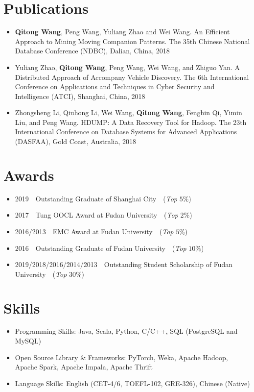 \documentclass{resume}
\begin{document}
\section{Publications}
\begin{itemize}  
  \item \textbf{Qitong Wang}, Peng Wang, Yuliang Zhao and Wei Wang. 
  An Efficient Approach to Mining Moving Companion Patterns. 
  The 35th Chinese National Database Conference (NDBC), Dalian, China, 2018
  \item Yuliang Zhao, \textbf{Qitong Wang}, Peng Wang, Wei Wang, and Zhiguo Yan. 
  A Distributed Approach of Accompany Vehicle Discovery. 
  The 6th International Conference on Applications and Techniques in Cyber Security and Intelligence (ATCI), Shanghai, China, 2018
  \item Zhongsheng Li, Qiuhong Li, Wei Wang, \textbf{Qitong Wang}, Fengbin Qi, Yimin Liu, and Peng Wang. 
  HDUMP: A Data Recovery Tool for Hadoop. 
  The 23th International Conference on Database Systems for Advanced Applications (DASFAA), Gold Coast, Australia, 2018
\end{itemize}

% 
% 

\section{Awards}
\begin{itemize}
  \item 2019\ \ Outstanding Graduate of Shanghai City\ \ (\textit{Top} $5\%$) %
  \item 2017\ \ Tung OOCL Award at Fudan University\ \ (\textit{Top} $2\%$) %
  \item 2016/2013\ \  EMC Award at Fudan University\ \ (\textit{Top} $5\%$) %
  \item 2016\ \ Outstanding Graduate of Fudan University\ \ (\textit{Top} $10\%$) %
  \item 2019/2018/2016/2014/2013\ \ Outstanding Student Scholarship of Fudan University\ \ (\textit{Top} $30\%$)
\end{itemize}

% 
% 

\section{Skills}
\begin{itemize}[parsep=0.5ex]
  \item Programming Skills: Java, Scala, Python, C/C++, SQL (PostgreSQL and MySQL)
  \item Open Source Library \& Frameworks: PyTorch, Weka, Apache Hadoop, Apache Spark, Apache Impala, Apache Thrift
  \item Language Skills: English (CET-4/6, TOEFL-102, GRE-326), Chinese (Native)
\end{itemize}
\end{document}
